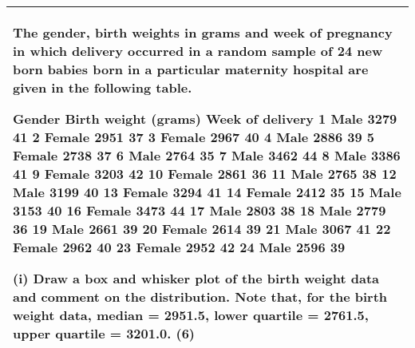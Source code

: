 \documentclass[a4paper,12pt]{article}
\begin{document}
  
\begin{table}[ht!]
 
\centering
 
\begin{tabular}{|p{15cm}|}
 
\hline  


 The gender, birth weights in grams and week of pregnancy in which delivery occurred in a random sample of 24 new born babies born in a particular maternity hospital are given in the following table. 
 
 
 Gender Birth weight (grams) 
Week of delivery 
1 Male 3279 41 
2 Female 2951 37 
3 Female 2967 40 
4 Male 2886 39 
5 Female 2738 37 
6 Male 2764 35 
7 Male 3462 44 
8 Male 3386 41 
9 Female 3203 42 
10 Female 2861 36 
11 Male 2765 38 
12 Male 3199 40 
13 Female 3294 41 
14 Female 2412 35 
15 Male 3153 40 
16 Female 3473 44 
17 Male 2803 38 
18 Male 2779 36 
19 Male 2661 39 
20 Female 2614 39 
21 Male 3067 41 
22 Female 2962 40 
23 Female 2952 42 
24 Male 2596 39 
 
 
 
(i) Draw a box and whisker plot of the birth weight data and comment on the distribution.  
Note that, for the birth weight data, median = 2951.5, lower quartile = 2761.5, upper quartile = 3201.0. (6) 

\\ \hline
  
\end{tabular}

\end{table}


        
\end{document}
